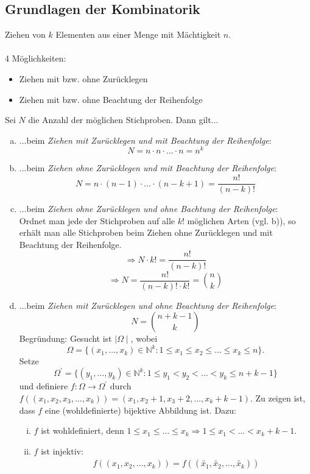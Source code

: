 \documentclass[a4paper,12pt,fleqn]{scrartcl}
\newcommand{\N}{\mathbb{N}}
\newcommand{\impl}{\Rightarrow}
\theoremstyle{definition}
\theoremstyle{plain}
\theoremstyle{remark}
\begin{document}
\subsection{Grundlagen der Kombinatorik}
Ziehen von $k$ Elementen aus einer Menge mit Mächtigkeit $n$.\\
\\
4 Möglichkeiten:
\begin{itemize}
\item Ziehen mit bzw. ohne Zurücklegen
\item Ziehen mit bzw. ohne Beachtung der Reihenfolge
\end{itemize}
Sei $N$ die Anzahl der möglichen Stichproben. Dann gilt...
\begin{enumerate}[a)]
\item ...beim \emph{Ziehen mit Zurücklegen und mit Beachtung der Reihenfolge}:
\[N = n \cdot n \cdot \ldots \cdot n = n^{k}\]
\item ...beim \emph{Ziehen ohne Zurücklegen und mit Beachtung der Reihenfolge}:
\[N = n \cdot (n-1) \cdot \ldots \cdot (n-k+1) = \frac{n!}{(n-k)!}\]
\item ...beim \emph{Ziehen ohne Zurücklegen und ohne Bachtung der Reihenfolge}:\\
Ordnet man jede der Stichproben auf alle $k!$ möglichen Arten (vgl. b)), so erhält man alle Stichproben beim Ziehen ohne Zurücklegen und mit Beachtung der Reihenfolge.
\[\impl N \cdot k! = \frac{n!}{(n-k)!}\]
\[\impl N = \frac{n!}{(n-k)! \cdot k!} = \binom{n}{k}\]
\item ...beim \emph{Ziehen mit Zurücklegen und ohne Beachtung der Reihenfolge}:
\[N = \binom{n+k-1}{k}\]
Begründung: Gesucht ist $\mid \Omega \mid$, wobei 
\[\Omega=\{(x_1, \ldots, x_k) \in \N^{k}:1 \leq x_1 \leq x_2 \leq \ldots \leq x_k \leq n\}.\]
Setze \[\Omega^\prime=\{(y_1, \ldots, y_k) \in \N^{k}:1 \leq y_1 < y_2 < \ldots < y_k \leq n+k-1\}\] und definiere $f: \Omega \rightarrow \Omega^\prime$ durch $f((x_1, x_2, x_3, \ldots, x_k)) = (x_1, x_2+1, x_3+2, \ldots, x_k+k-1)$. Zu zeigen ist, dass $f$ eine (wohldefinierte) bijektive Abbildung ist. Dazu:
\begin{enumerate}[(i)]
\item $f$ ist wohldefiniert, denn $1 \leq x_1 \leq \ldots \leq x_k \impl 1 \leq x_1 < \ldots < x_k+k-1$.
\item $f$ ist injektiv:
\begin{align*}
&f((x_1, x_2, \ldots, x_k)) = f((\widetilde{x_1}, \widetilde{x_2}, \ldots, \widetilde{x_k})) \\

\end{align*}
\end{enumerate}
\end{enumerate}
\end{document}
